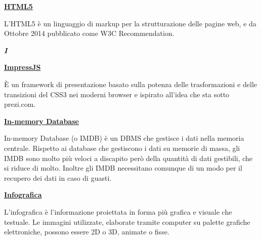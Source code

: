 \bigskip
\begin{addmargin}[0em]{0em}	
	\textbf{\underline{HTML5}}
\end{addmargin}

\medskip
\begin{addmargin}[5em]{1em}	
L'HTML5 è un linguaggio di markup per la strutturazione delle pagine web, e da Ottobre 2014 pubblicato come W3C Recommendation.
\end{addmargin}	

\newpage

\cleardoublepage
{}
{}
\noindent\hrulefill\hspace{4mm}\textbf{\textsl{\Huge{I}}}\hspace{4mm}\hrulefill

\vspace*{2\bigskipamount}

\begin{addmargin}[0em]{0em}	
	\textbf{\underline{ImpressJS}}
\end{addmargin}

\medskip
\begin{addmargin}[5em]{1em}	
	È un framework di presentazione basato sulla potenza delle trasformazioni e delle transizioni del CSS3 nei moderni browser e ispirato all'idea che sta sotto prezi.com.
\end{addmargin}	

\bigskip

\begin{addmargin}[0em]{0em}	
	\textbf{\underline{In-memory Database}}
\end{addmargin}

\medskip
\begin{addmargin}[5em]{1em}	
	In-memory Database (o IMDB) è un DBMS che gestisce i dati nella memoria centrale. Rispetto ai database che gestiscono i dati su memorie di massa, gli IMDB sono molto più veloci a discapito però della quantità di dati gestibili, che si riduce di molto. Inoltre gli IMDB necessitano comunque di un modo per il recupero dei dati in caso di guasti.
\end{addmargin}	

\bigskip
\begin{addmargin}[0em]{0em}	
	\textbf{\underline{Infografica}}
\end{addmargin}

\medskip
\begin{addmargin}[5em]{1em}		
	L'infografica è l'informazione proiettata in forma più grafica e visuale che testuale. Le immagini utilizzate, elaborate tramite computer su palette grafiche elettroniche, possono essere 2D o 3D, animate o fisse.
\end{addmargin}	

